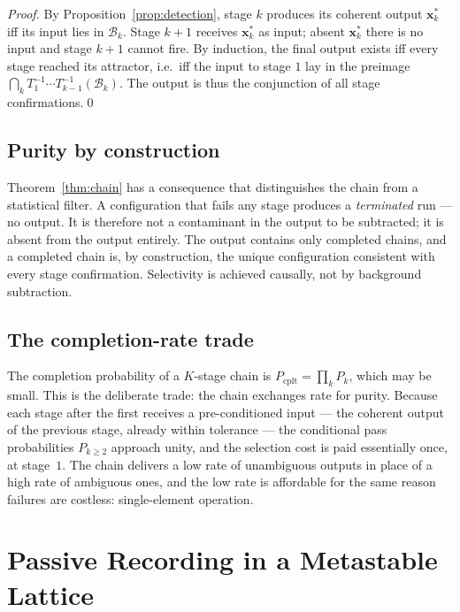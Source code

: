\documentclass[twocolumn,10pt,a4paper]{article}
\theoremstyle{thmstyle}
\theoremstyle{definition}
\theoremstyle{remark}
\newcommand{\xstar}{\mathbf{x}^{\ast}}
\begin{document}
\begin{proof}
By Proposition~\ref{prop:detection}, stage $k$ produces its coherent output
$\xstar_k$ iff its input lies in $\mathcal{B}_k$. Stage $k+1$ receives
$\xstar_k$ as input; absent $\xstar_k$ there is no input and stage $k+1$
cannot fire. By induction, the final output exists iff every stage reached its
attractor, i.e.\ iff the input to stage $1$ lay in the preimage
$\bigcap_k T_{1}^{-1}\cdots T_{k-1}^{-1}(\mathcal{B}_k)$. The output is thus
the conjunction of all stage confirmations.\qed
\end{proof}

\subsection{Purity by construction}

Theorem~\ref{thm:chain} has a consequence that distinguishes the chain from a
statistical filter. A configuration that fails any stage produces a
\emph{terminated} run --- no output. It is therefore not a contaminant in the
output to be subtracted; it is absent from the output entirely. The output
contains only completed chains, and a completed chain is, by construction, the
unique configuration consistent with every stage confirmation. Selectivity is
achieved causally, not by background subtraction.

\subsection{The completion-rate trade}

The completion probability of a $K$-stage chain is $P_{\mathrm{cplt}}
=\prod_k P_k$, which may be small. This is the deliberate trade: the chain
exchanges rate for purity. Because each stage after the first receives a
pre-conditioned input --- the coherent output of the previous stage, already
within tolerance --- the conditional pass probabilities $P_{k\geq2}$ approach
unity, and the selection cost is paid essentially once, at stage~$1$. The
chain delivers a low rate of unambiguous outputs in place of a high rate of
ambiguous ones, and the low rate is affordable for the same reason failures
are costless: single-element operation.

\section{Passive Recording in a Metastable Lattice}
\label{sec:recording}
\end{document}
